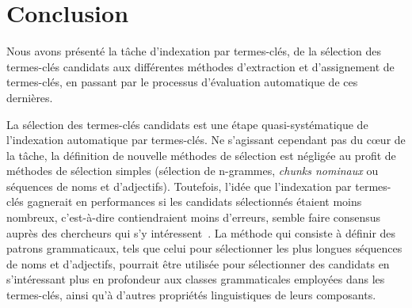 


  \section{Conclusion}
  \label{sec:main-state_of_the_art-automatic_evaluation_of_keyphrase_annotation-conclusion}
    Nous avons présenté la tâche d'indexation par termes-clés, de la sélection
    des termes-clés candidats aux différentes méthodes d'extraction et
    d'assignement de termes-clés, en passant par le processus d'évaluation
    automatique de ces dernières.

    La sélection des termes-clés candidats est une étape quasi-systématique de
    l'indexation automatique par termes-clés. Ne s'agissant cependant pas du
    c\oe{}ur de la tâche, la définition de nouvelle méthodes de sélection est
    négligée au profit de méthodes de sélection simples (sélection de n-grammes,
    \textit{chunks nominaux} ou séquences de noms et d'adjectifs). Toutefois,
    l'idée que l'indexation par termes-clés gagnerait en performances si les
    candidats sélectionnés étaient moins nombreux, c'est-à-dire contiendraient
    moins d'erreurs, semble faire consensus auprès des chercheurs qui s'y
    intéressent~\cite{wang2014keyphraseextractionpreprocessing}. La méthode qui
    consiste à définir des patrons grammaticaux, tels que celui pour
    sélectionner les plus longues séquences de noms et d'adjectifs, pourrait
    être utilisée pour sélectionner des candidats en s'intéressant plus en
    profondeur aux classes grammaticales employées dans les termes-clés, ainsi
    qu'à d'autres propriétés linguistiques de leurs composants.

